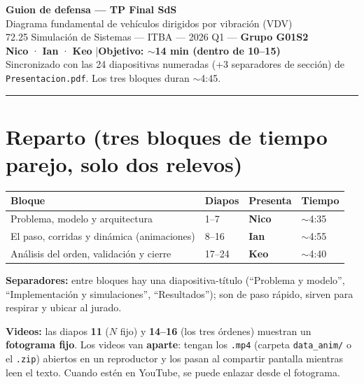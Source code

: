 \documentclass[11pt,a4paper]{article}
\begin{document}
\begin{center}
  {\LARGE\textbf{Guion de defensa --- TP Final SdS}}\\[4pt]
  {\large Diagrama fundamental de vehículos dirigidos por vibración (VDV)}\\[6pt]
  72.25 Simulación de Sistemas --- ITBA --- 2026 Q1 --- \textbf{Grupo G01S2}\\[4pt]
  \textcolor{cnico}{\textbf{Nico}} \; · \; \textcolor{cian}{\textbf{Ian}} \; · \; \textcolor{ckeo}{\textbf{Keo}}
  \hspace{1.5em}|\hspace{1.5em}\textbf{Objetivo: $\sim$14 min (dentro de 10--15)}\\[2pt]
  {\small Sincronizado con las 24 diapositivas numeradas (+3 separadores de sección) de \texttt{Presentacion.pdf}. Los tres bloques duran $\sim$4:45.}
\end{center}

\vspace{2pt}
\hrule
\vspace{6pt}

\section*{Reparto (tres bloques de tiempo parejo, solo dos relevos)}

\begin{center}
\begin{tabular}{llll}
\toprule
\textbf{Bloque} & \textbf{Diapos} & \textbf{Presenta} & \textbf{Tiempo} \\
\midrule
Problema, modelo y arquitectura & 1--7 & \textcolor{cnico}{\textbf{Nico}} & $\sim$4:35 \\
El paso, corridas y dinámica (animaciones) & 8--16 & \textcolor{cian}{\textbf{Ian}} & $\sim$4:55 \\
Análisis del orden, validación y cierre & 17--24 & \textcolor{ckeo}{\textbf{Keo}} & $\sim$4:40 \\
\bottomrule
\end{tabular}
\end{center}

\textbf{Separadores:} entre bloques hay una diapositiva-título (``Problema y modelo'', ``Implementación y
simulaciones'', ``Resultados''); son de paso rápido, sirven para respirar y ubicar al jurado.

\textbf{Videos:} las diapos \textbf{11} ($N$ fijo) y \textbf{14--16} (los tres órdenes) muestran un
\textbf{fotograma fijo}. Los videos van \textbf{aparte}: tengan los \texttt{.mp4} (carpeta
\texttt{data\_anim/} o el \texttt{.zip}) abiertos en un reproductor y los pasan al compartir pantalla
mientras leen el texto. Cuando estén en YouTube, se puede enlazar desde el fotograma.
\end{document}
